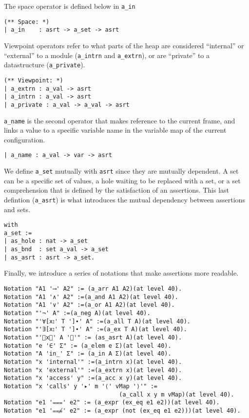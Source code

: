 \documentclass[12pt]{article}
\begin{document}
The space operator is defined below in \verb|a_in|
\begin{verbatim}
(** Space: *)
| a_in    : asrt -> a_set -> asrt
\end{verbatim}
Viewpoint operators refer to what parts of the heap are considered ``internal'' or ``external'' to a module (\verb|a_intrn| and \verb|a_extrn|), or are ``private'' to a datastructure (\verb|a_private|).
\begin{verbatim}
(** Viewpoint: *)
| a_extrn : a_val -> asrt
| a_intrn : a_val -> asrt
| a_private : a_val -> a_val -> asrt
\end{verbatim}
\verb|a_name| is the second operator that makes reference to the current frame, and links a value to a specific variable name in the variable map of the current configuration.
\begin{verbatim}
| a_name : a_val -> var -> asrt
\end{verbatim}
We define \verb|a_set| mutually with \verb|asrt| since they are mutually dependent. A set can be a specific set of values, a hole waiting to be replaced with a set, or a set comprehension 
that is defined by the satisfaction of an assertions. This last defintion (\verb|a_asrt|)  is what introduces the mutual dependency between assertions and sets.
\begin{verbatim}
with
a_set :=
| as_hole : nat -> a_set
| as_bnd  : set a_val -> a_set
| as_asrt : asrt -> a_set.
\end{verbatim}

Finally, we introduce a series of notations that make assertions more readable.
\begin{verbatim}
Notation "A1 '⟶' A2" := (a_arr A1 A2)(at level 40).
Notation "A1 '∧' A2" :=(a_and A1 A2)(at level 40).
Notation "A1 '∨' A2" :=(a_or A1 A2)(at level 40).
Notation "'¬' A" :=(a_neg A)(at level 40).
Notation "'∀[x⦂' T ']∙' A" :=(a_all T A)(at level 40).
Notation "'∃[x⦂' T ']∙' A" :=(a_ex T A)(at level 40).
Notation "'⦃x⃒' A '⦄'" := (as_asrt A)(at level 40).
Notation "e '∈' Σ" := (a_elem e Σ)(at level 40).
Notation "A 'in_' Σ" := (a_in A Σ)(at level 40).
Notation "x 'internal'" :=(a_intrn x)(at level 40).
Notation "x 'external'" :=(a_extrn x)(at level 40).
Notation "x 'access' y" :=(a_acc x y)(at level 40).
Notation "x 'calls' y '▸' m '⟨' vMap '⟩'" :=
                                 (a_call x y m vMap)(at level 40).
Notation "e1 '⩶' e2" := (a_expr (ex_eq e1 e2))(at level 40).
Notation "e1 '⩶̸' e2" := (a_expr (not (ex_eq e1 e2)))(at level 40).
\end{verbatim}
\end{document}
